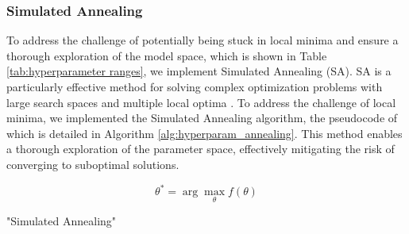 \documentclass[11pt]{article}
\begin{document}
\subsubsection{Simulated Annealing}
To address the challenge of potentially being stuck in local minima and ensure a thorough exploration of the model space, which is shown in Table \ref{tab:hyperparameter ranges}, we implement Simulated Annealing (SA). SA is a particularly effective method for solving complex optimization problems with large search spaces and multiple local optima \cite{simanneal}.
To address the challenge of local minima, we implemented the Simulated Annealing algorithm, the pseudocode of which is detailed in Algorithm \ref{alg:hyperparam_annealing}. This method enables a thorough exploration of the parameter space, effectively mitigating the risk of converging to suboptimal solutions.

\[
\theta^* = \arg\max_{\theta} f(\theta)
\]


\begin{algorithm}[h!]
    \caption{"Simulated Annealing"}
    \label{alg:hyperparam_annealing}
    \begin{algorithmic}
    \;
    \;
    \;

        \EndIf
        \EndIf

    \EndFor \\
    \EndFunction
    \end{algorithmic}
\end{algorithm}
\end{document}

